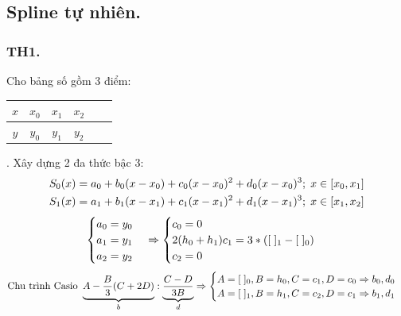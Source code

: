 \documentclass[12pt, a4paper]{report}
\begin{document}
\subsection{Spline tự nhiên.}
\subsubsection{TH1.} Cho bảng số gồm 3 điểm: \begin{tabular}{c|ccccc}
    $x$ & $x_0$ & $x_1$ & $x_2$ \\ \hline
    $y$ & $y_0$ & $y_1$ & $y_2$  
    \end{tabular}. Xây dựng 2 đa thức bậc 3: 
\[
    \begin{aligned}
        S_0 (x) &= a_0 + b_0(x-x_0) + c_0(x-x_0)^2 + d_0(x-x_0)^3; \thickspace x \in \lbrack x_0,x_1 \rbrack \\
        S_1 (x) &= a_1 + b_1(x-x_1) + c_1(x-x_1)^2 + d_1(x-x_1)^3; \thickspace x \in \lbrack x_1,x_2 \rbrack
    \end{aligned}    
\]
\[
    \begin{cases}
        a_0 = y_0 \\
        a_1 = y_1 \\
        a_2 = y_2 
    \end{cases} \Rightarrow 
    \begin{cases}
        c_0 = 0 \\
        2(h_0 + h_1)c_1 = 3*(\lbrack \thickspace \rbrack_1 - \lbrack \thickspace \rbrack_0) \\
        c_2 = 0
    \end{cases}    
\]
\[
    \text{Chu trình Casio } \underbrace{A - \frac{B}{3}(C+2D)}_{b} : \underbrace{\frac{C - D}{3B}}_{d} \Rightarrow \begin{cases}
        A = \lbrack \thickspace \rbrack_0, B = h_0, C = c_1, D = c_0 \Rightarrow b_0,d_0 \\
        A = \lbrack \thickspace \rbrack_1, B = h_1, C = c_2, D = c_1 \Rightarrow b_1,d_1
    \end{cases}
\]
\end{document}
